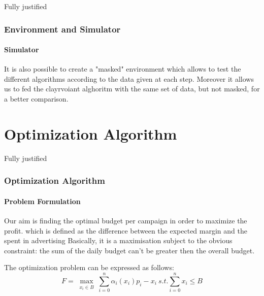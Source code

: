 \documentclass{beamer}
\begin{document}

\begin {frame}{Fully justified}

\frametitle{Environment and Simulator}
\framesubtitle{Simulator}
It is also possible to create a "masked" environment which allows to test the different algorithms according to the data given at each step. Moreover it allows us to fed the clayrvoiant alghoritm with the same set of data, but not masked, for a better comparison.

\end{frame}


\AtBeginSection[]
{
\begin{frame}{}
    \tableofcontents[currentsection]
\end{frame}
}


\section{Optimization Algorithm}

\begin{frame}{Fully justified}

\frametitle{Optimization Algorithm}
\framesubtitle{Problem Formulation}
Our aim is finding the optimal budget per campaign in order to maximize the profit.
which is defined as the difference between the expected margin and the spent in advertising
Basically, it is a maximisation subject to the obvious constraint: the sum of the daily budget can't be greater then the overall budget.

The optimization problem can be expressed as follows:
\begin{displaymath}
F=\max_{\substack{x_i\in B}} \sum_{i=0}^n \alpha_i(x_i)p_i-x_i \ s.t. \sum_{i=0}^n x_i\leq B
\end{displaymath}

\end{frame}



\AtBeginSection[]
{
\begin{frame}{}
    \tableofcontents[currentsection]
\end{frame}
}
\end{document}
